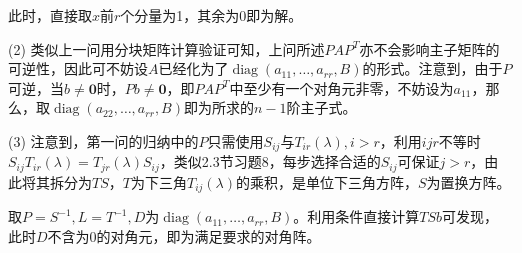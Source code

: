 \documentclass[a4paper,UTF8,fontset=windows]{ctexart}
\DeclareMathOperator{\diag}{diag}
\begin{document}
\begin{enumerate}
此时，直接取$x$前$r$个分量为1，其余为0即为解。

(2) 类似上一问用分块矩阵计算验证可知，上问所述$PAP^T$亦不会影响主子矩阵的可逆性，因此可不妨设$A$已经化为了$\diag(a_{11},\dots,a_{rr},B)$的形式。注意到，由于$P$可逆，当$b\ne\mathbf{0}$时，$Pb\ne\mathbf{0}$，即$PAP^T$中至少有一个对角元非零，不妨设为$a_{11}$，那么，取$\diag(a_{22},\dots,a_{rr},B)$即为所求的$n-1$阶主子式。

(3) 注意到，第一问的归纳中的$P$只需使用$S_{ij}$与$T_{ir}(\lambda),i>r$，利用$ijr$不等时$S_{ij}T_{ir}(\lambda)=T_{jr}(\lambda)S_{ij}$，类似2.3节习题8，每步选择合适的$S_{ij}$可保证$j>r$，由此将其拆分为$TS$，$T$为下三角$T_{ij}(\lambda)$的乘积，是单位下三角方阵，$S$为置换方阵。

取$P=S^{-1},L=T^{-1},D$为$\diag(a_{11},\dots,a_{rr},B)$。利用条件直接计算$TSb$可发现，此时$D$不含为0的对角元，即为满足要求的对角阵。
\end{enumerate}
\end{document}
